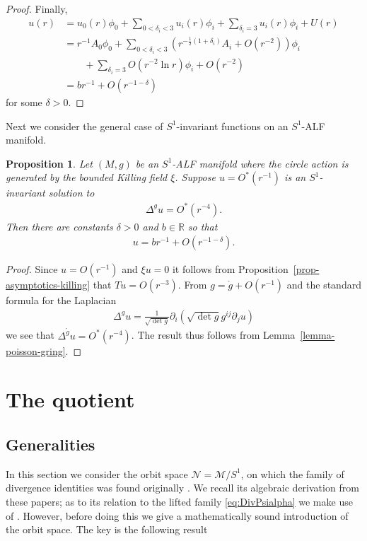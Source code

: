 \documentclass[a4paper,10pt,reqno]{amsart}
\newcommand{\Reals}{\mathbb{R}}
\newcommand{\cM}{\mathcal{M}}
\newcommand{\cN}{\mathcal{N}}
\theoremstyle{plain}
\newtheorem{prop}[thm]{Proposition}
\newcommand{\gring}{\mathring{g}}
\numberwithin{equation}{section}
\begin{document}
\begin{proof}
Finally,
\begin{align}
u(r) &= 
u_0(r)\phi_0 
+ \sum_{0 < \delta_i < 3} u_i(r) \phi_i 
+ \sum_{\delta_i = 3} u_i(r) \phi_i 
+ U(r) \nonumber \\
&=
r^{-1} A_0 \phi_0
+ \sum_{0 < \delta_i < 3} 
\left( r^{-\frac{1}{2}(1+\delta_i)} A_i + O(r^{-2}) \right)\phi_i \nonumber \\
&\qquad
+ \sum_{\delta_i = 3} O(r^{-2} \ln r)  \phi_i
+ O(r^{-2})\nonumber \\
&= b r^{-1} + O(r^{-1-\delta})
\end{align}
for some $\delta > 0$.
\end{proof}

Next we consider the general case of $S^1$-invariant functions on an $S^1$-ALF manifold. 

\begin{prop} \label{prop:poisson-g}
Let $(M,g)$ be an $S^1$-ALF manifold where the circle action is generated by the bounded Killing field $\xi$. Suppose $u = O^*(r^{-1})$ is an $S^1$-invariant solution to
\begin{align}
\Delta^{g}u = O^*(r^{-4}).
\end{align}
Then there are constants $\delta >0$ and $b \in \Reals$ so that 
\begin{align} 
u = br^{-1} + O(r^{-1-\delta}).
\end{align} 
\end{prop}

\begin{proof}
Since $u = O(r^{-1})$ and $\xi u = 0$ it follows from Proposition~\ref{prop-asymptotics-killing} that $Tu = O(r^{-3})$. From $g = \gring + O(r^{-1})$ and the standard formula for the Laplacian
\begin{align}
\Delta^g u 
= \frac{1}{\sqrt{\det g}} \partial_i \left( \sqrt{\det g} g^{ij}  \partial_j u \right)
\end{align}
we see that $\Delta^{\gring}u = O^*(r^{-4})$. The result thus follows from Lemma~\ref{lemma-poisson-gring}.
\end{proof}


%
\section{The quotient} \label{sec:quotient}
%

\subsection{Generalities}
In this section we consider the orbit space $\cN = \cM/ S^1$, on which the family  of divergence identities was found originally 
\cite{MR747036,simon:1995}. We recall its algebraic derivation  from these papers; as to its  relation to the lifted family \eqref{eq:DivPsialpha} we make use of \cite{MR1701088}. 
However, before doing this we give a mathematically sound introduction of the orbit space.
The key is the following result
\end{document}
